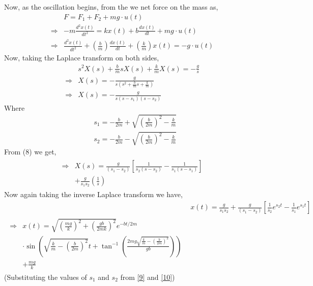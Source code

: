 \documentclass[journal,12pt,twocolumn]{IEEEtran}
\theoremstyle{remark}
\begin{document}
\begin{enumerate}
Now, as the oscillation begins, from the  we net force on the mass as,
\begin{align}
    &F=F_{1}+F_{2}+mg\cdot u(t) \label{3}\\
    \Rightarrow &-m\frac{d^2x(t)}{dt^2}=kx(t)+b\frac{dx(t)}{dt}+mg\cdot u(t) \label{4}\\
    \Rightarrow &\frac{d^2x(t)}{dt^2}+\left(\frac{b}{m}\right)\frac{dx(t)}{dt}+\left(\frac{k}{m}\right)x(t)=-g\cdot u(t) \label{5}
\end{align}
Now, taking the Laplace transform on both sides,
\begin{align}
&s^2X(s)+\frac{b}{m}sX(s)+\frac{k}{m}X(s)=-\frac{g}{s} \label{6}\\
\Rightarrow &X(s)=-\frac{g}{s\left(s^2+\frac{b}{m}s+\frac{k}{m}\right)} \label{7}\\
\Rightarrow &X(s)=-\frac{g}{s(s-s_1)(s-s_2)} \label{8}
\end{align}
Where
\begin{align}
&s_1=-\frac{b}{2m}+\sqrt{\left(\frac{b}{2m}\right)^2-\frac{k}{m}} \label{9}\\
&s_2=-\frac{b}{2m}-\sqrt{\left(\frac{b}{2m}\right)^2-\frac{k}{m}} \label{10}
\end{align}
From (8) we get,
\begin{align}
\begin{split}
\Rightarrow &X(s)=\frac{g}{(s_1-s_2)}\left[\frac{1}{s_2(s-s_2)}-\frac{1}{s_1(s-s_1)}\right] \label{11}\\
&+\frac{g}{s_1s_2}\left(\frac{1}{s}\right)
\end{split}
\end{align}
Now again taking the inverse Laplace transform we have,
\begin{align}
&x(t)=\frac{g}{s_1s_2}+\frac{g}{(s_1-s_2)}\left[\frac{1}{s_2}e^{s_2t}-\frac{1}{s_1}e^{s_1t}\right] \label{12}\\
\begin{split}
\Rightarrow &x(t)=\sqrt{\left(\frac{mg}{k}\right)^2+\left(\frac{gb}{2mk}\right)^2}e^{-bt/2m} \\
&\cdot\sin{\left(\sqrt{\frac{k}{m}-\left(\frac{b}{2m}\right)^2}t+\tan^{-1}\left(\frac{2mg\sqrt{\frac{k}{m}-\left(\frac{b}{2m}\right)^2}}{gb}\right)\right)} \\
&+\frac{mg}{k} \label{13}
\end{split}
\end{align}
(Substituting the values of $s_1$ and $s_2$ from \eqref{9} and \eqref{10}) \\
\begin{figure}[h]

\end{figure}
\end{enumerate}
\end{document}
